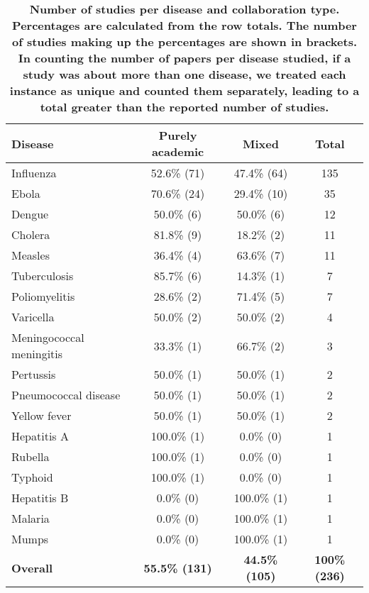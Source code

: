 \documentclass[10pt,letterpaper]{article}
\begin{document}
\begin{table}[!h]
		\setlength\arrayrulewidth{1pt} 
	\centering
	\caption{\bf Number of studies per disease and collaboration type. Percentages are calculated from the row totals. The number of studies making up the percentages are shown in brackets. In counting the number of papers per disease studied, if a study was about more than one disease, we treated each instance as unique and counted them separately, leading to a total greater than the reported number of studies.}
	\label{chap3-table: Number of studies per disease and collaboration type}
	\begin{tabular}{|l c c c|}
		\hline
		\textbf{Disease}         & \textbf{Purely academic} & \textbf{Mixed} & \textbf{Total} \\ \hline
		Influenza                & 52.6\% (71)     & 47.4\% (64) & 135   \\ \hline
		Ebola                    & 70.6\% (24)     & 29.4\% (10) & 35    \\ \hline
		Dengue                   & 50.0\% (6)      & 50.0\% (6)  & 12    \\ \hline
		Cholera                  & 81.8\% (9)      & 18.2\% (2)  & 11    \\ \hline
		Measles                  & 36.4\% (4)      & 63.6\% (7)  & 11    \\ \hline
		Tuberculosis             & 85.7\% (6)      & 14.3\% (1)  & 7     \\ \hline
		Poliomyelitis            & 28.6\% (2)      & 71.4\% (5)  & 7     \\ \hline
		Varicella                & 50.0\% (2)      & 50.0\% (2)  & 4     \\ \hline
		Meningococcal meningitis & 33.3\% (1)      & 66.7\% (2)  & 3     \\ \hline
		Pertussis                & 50.0\% (1)      & 50.0\% (1)  & 2     \\ \hline
		Pneumococcal disease     & 50.0\% (1)      & 50.0\% (1)  & 2     \\ \hline
		Yellow fever             & 50.0\% (1)      & 50.0\% (1)  & 2     \\ \hline
		Hepatitis A             & 100.0\% (1)     & 0.0\% (0)   & 1     \\ \hline
		Rubella                  & 100.0\% (1)     & 0.0\% (0)   & 1     \\ \hline
		Typhoid                  & 100.0\% (1)     & 0.0\% (0)   & 1     \\ \hline
		Hepatitis B              & 0.0\% (0)       & 100.0\% (1) & 1     \\ \hline
		Malaria                  & 0.0\% (0)       & 100.0\% (1) & 1     \\ \hline
		Mumps                    & 0.0\% (0)       & 100.0\% (1) & 1    \\ \hline \rowcolor{gray!20}
		\textbf{Overall}			&	\textbf{55.5\% (131)}   			& \textbf{44.5\% (105)}   & \textbf{100\% (236)} \\
		\hline
	\end{tabular}
	\label{studies_per_disease_and_collaboration_type}
\end{table}
\end{document}
